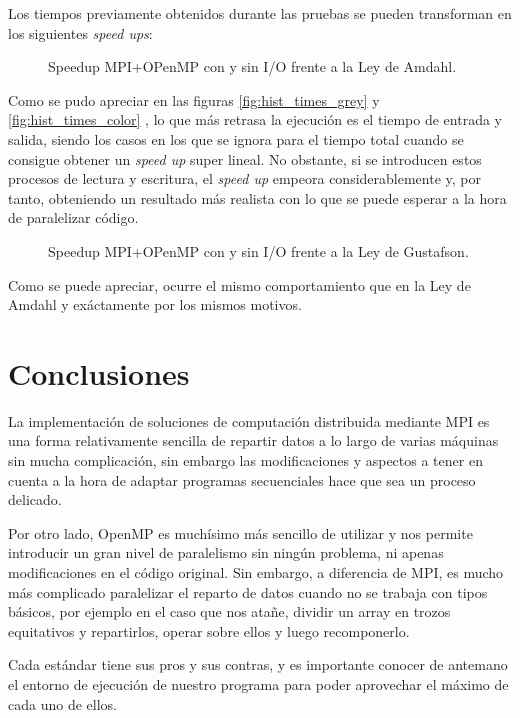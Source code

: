 \documentclass[12pt]{report} %
\begin{document}
Los tiempos previamente obtenidos durante las pruebas se pueden transforman en los siguientes \textit{speed ups}:

\begin{figure}[H]
	\makebox[\textwidth][c]{
        
    }
	\caption{Speedup MPI+OPenMP con y sin I/O frente a la Ley de Amdahl.}
    \label{fig:comparacion_speedup}
\end{figure}

Como se pudo apreciar en las figuras \ref{fig:hist_times_grey}  y
\ref{fig:hist_times_color} , lo que más retrasa la
ejecución es el tiempo de entrada y salida, siendo los casos en los que se ignora para el tiempo total
cuando se consigue obtener un \textit{speed up} super lineal. No obstante,
si se introducen estos procesos de lectura y escritura, el \textit{speed up} empeora considerablemente y, por
tanto, obteniendo un resultado más realista con lo que se puede esperar a la hora de paralelizar código.

\begin{figure}[H]
	\makebox[\textwidth][c]{
        
    }
	\caption{Speedup MPI+OPenMP con y sin I/O frente a la Ley de Gustafson.}
    \label{fig:comparacion_speedup}
\end{figure}

Como se puede apreciar, ocurre el mismo comportamiento que en la Ley de Amdahl y exáctamente por
los mismos motivos.

\chapter{Conclusiones}

La implementación de soluciones de computación distribuida mediante MPI es una forma relativamente sencilla
de repartir datos a lo largo de varias máquinas sin mucha complicación, sin embargo las modificaciones y aspectos
a tener en cuenta a la hora de adaptar programas secuenciales hace que sea un proceso delicado.

Por otro lado, OpenMP es muchísimo más sencillo de utilizar y nos permite introducir un gran nivel de
paralelismo sin ningún problema, ni apenas modificaciones en el código original. Sin embargo, a diferencia
de MPI, es mucho más complicado paralelizar el reparto de datos cuando no se trabaja con tipos básicos,
por ejemplo en el caso que nos atañe, dividir un array en trozos equitativos y repartirlos, operar sobre
ellos y luego recomponerlo.

Cada estándar tiene sus pros y sus contras, y es importante conocer de antemano el entorno de ejecución de
nuestro programa para poder aprovechar el máximo de cada uno de ellos.


\nocite{*} %

\clearpage
{}
\printbibliography
\end{document}
